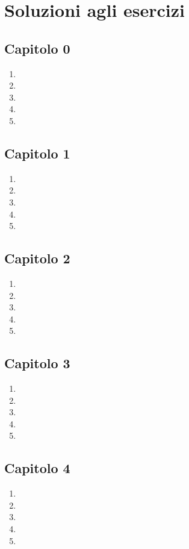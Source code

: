 
\chapter{Soluzioni agli esercizi}
\section*{Capitolo 0}
\begin{enumerate}
    \item
    \item     
    \item     
    \item     
    \item 
\end{enumerate}
\section*{Capitolo 1}
\begin{enumerate}
    \item
    \item     
    \item     
    \item     
    \item 
\end{enumerate}
\section*{Capitolo 2}
\begin{enumerate}
    \item
    \item     
    \item     
    \item     
    \item 
\end{enumerate}
\section*{Capitolo 3}
\begin{enumerate}
    \item
    \item     
    \item     
    \item     
    \item 
\end{enumerate}
\section*{Capitolo 4}
\begin{enumerate}
    \item
    \item     
    \item     
    \item     
    \item 
\end{enumerate}
